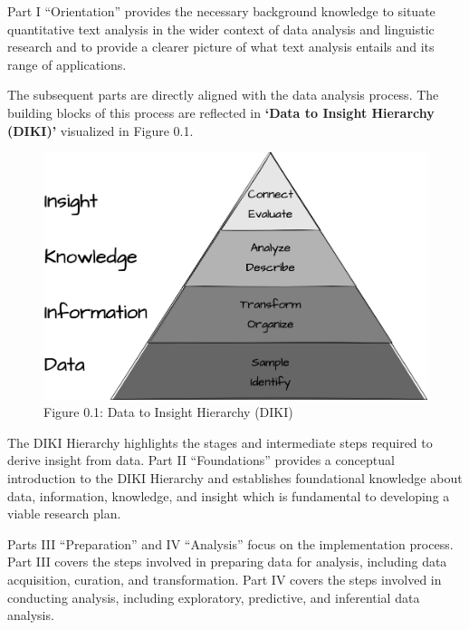 \documentclass[
  letterpaper,
  krantz1]{latex/krantz-mod}
\theoremstyle{definition}
\theoremstyle{definition}
\theoremstyle{remark}
\begin{document}
Part I ``Orientation'' provides the necessary background knowledge to
situate quantitative text analysis in the wider context of data analysis
and linguistic research and to provide a clearer picture of what text
analysis entails and its range of applications.

The subsequent parts are directly aligned with the data analysis
process. The building blocks of this process are reflected in
\textbf{`Data to Insight Hierarchy
(DIKI)'} visualized in Figure 0.1.

\begin{figure}

\centering
\includegraphics[width=0.75\linewidth]{part_0/figures/preface-diki.drawio.png}

\captionsetup{labelformat=empty,labelsep=none}
\caption[Figure 0.1: Data to Insight Hierarchy (DIKI)]{Figure 0.1: Data to Insight Hierarchy (DIKI)\footnotemark{}}

\end{figure}%


The DIKI Hierarchy highlights the stages and intermediate steps required
to derive insight from data. Part II ``Foundations'' provides a
conceptual introduction to the DIKI Hierarchy and establishes
foundational knowledge about data, information, knowledge, and insight
which is fundamental to developing a viable research plan.

Parts III ``Preparation'' and IV ``Analysis'' focus on the
implementation process. Part III covers the steps involved in preparing
data for analysis, including data acquisition, curation, and
transformation. Part IV covers the steps involved in conducting
analysis, including exploratory, predictive, and inferential data
analysis.
\end{document}
